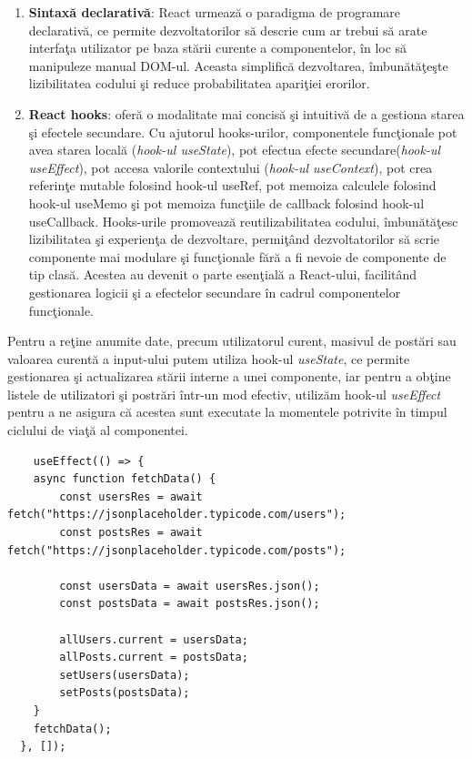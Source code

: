 \documentclass[12pt, a4paper]{report}
\begin{document}
\begin{enumerate}
	\item \textbf{Sintax\u a declarativ\u a}: React urmeaz\u a o paradigma de programare declarativ\u a, ce permite dezvoltatorilor s\u a descrie cum ar trebui s\u a arate interfa\c ta utilizator pe baza st\u arii curente a componentelor, \^in loc s\u a manipuleze manual DOM-ul. Aceasta simplific\u a dezvoltarea, \^imbun\u at\u a\c te\c ste lizibilitatea codului \c si reduce probabilitatea apari\c tiei erorilor.
	\item \textbf{React hooks}: ofer\u a o modalitate mai concis\u a \c si intuitiv\u a de a gestiona starea \c si efectele secundare. Cu ajutorul hooks-urilor, componentele func\c tionale pot avea starea local\u a (\textit{hook-ul useState}), pot efectua efecte secundare(\textit{hook-ul useEffect}), pot accesa valorile contextului (\textit{hook-ul useContext}), pot crea referin\c te mutable folosind hook-ul useRef, pot memoiza calculele folosind hook-ul useMemo \c si pot memoiza func\c tiile de callback folosind hook-ul useCallback. Hooks-urile promoveaz\u a reutilizabilitatea codului, \^imbun\u at\u a\c tesc lizibilitatea \c si experien\c ta de dezvoltare, permi\c t\^and dezvoltatorilor s\u a scrie componente mai modulare \c si func\c tionale f\u ar\u a a fi nevoie de componente de tip clas\u a. Acestea au devenit o parte esen\c tial\u a a React-ului, facilit\^and gestionarea logicii \c si a efectelor secundare \^in cadrul componentelor func\c tionale. \cite{react-hooks}
\end{enumerate}

Pentru a re\c tine anumite date, precum utilizatorul curent, masivul de post\u ari sau valoarea curent\u a a input-ului putem utiliza hook-ul \emph{useState}, ce permite gestionarea \c si actualizarea st\u arii interne a unei componente, iar pentru a ob\c tine listele de utilizatori \c si postr\u ari \^intr-un mod efectiv, utiliz\u am hook-ul \emph{useEffect} pentru a ne asigura c\u a acestea sunt executate la momentele potrivite \^in timpul ciclului de via\c t\u a al componentei.

\begin{lstlisting}
	useEffect(() => {
    async function fetchData() {
    	const usersRes = await fetch("https://jsonplaceholder.typicode.com/users");
    	const postsRes = await fetch("https://jsonplaceholder.typicode.com/posts");
      
		const usersData = await usersRes.json();
    	const postsData = await postsRes.json();

    	allUsers.current = usersData;
    	allPosts.current = postsData;
    	setUsers(usersData);
    	setPosts(postsData);
    }
    fetchData();
  }, []);
\end{lstlisting}
\newpage
\end{document}
